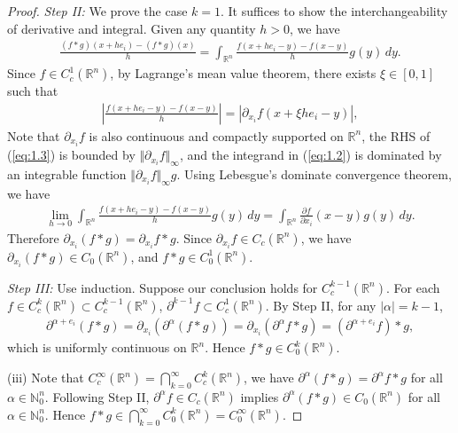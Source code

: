 \documentclass{article}
\numberwithin{equation}{section}
\newcommand{\bbR}{\mathbb{R}}
\theoremstyle{plain}
\theoremstyle{definition}
\begin{document}
\begin{proof}
	\textit{Step II:} We prove the case $k=1$. It suffices to show the interchangeability of derivative and integral. Given any quantity $h>0$, we have
	\begin{align}
		\frac{(f*g)(x+he_i) - (f*g)(x)}{h} = \int_{\bbR^n} \frac{f(x+he_i - y) - f(x-y)}{h}g(y)\,dy.\label{eq:1.2}
	\end{align}
	Since $f\in C^1_c(\mathbb{R}^n)$, by Lagrange's mean value theorem, there exists $\xi\in[0,1]$ such that
	\begin{align}
		\left\vert\frac{f(x+h e_i - y) - f(x-y)}{h}\right\vert = \left\vert \partial_{x_i}f(x+\xi h e_i - y)\right\vert,\label{eq:1.3}
	\end{align}
	Note that $\partial_{x_i}f$ is also continuous and compactly supported on $\mathbb{R}^n$, the RHS of (\ref{eq:1.3}) is bounded by $\Vert\partial_{x_i}f\Vert_\infty$, and the integrand in (\ref{eq:1.2}) is dominated by an integrable function $\Vert \partial_{x_i}f\Vert_\infty g$. Using Lebesgue's dominate convergence theorem, we have
	\begin{align*}
		\lim_{h\to 0}\int_{\bbR^n}\frac{f(x+h e_i - y) - f(x-y)}{h}g(y)\,dy = \int_{\bbR^n} \frac{\partial f}{\partial x_i}(x-y)g(y)\,dy.
	\end{align*}
	Therefore $\partial_{x_i}(f*g) = \partial_{x_i}f * g$. Since $\partial_{x_i}f\in C_c(\mathbb{R}^n)$, we have $\partial_{x_i}(f*g)\in C_0(\mathbb{R}^n)$, and $f*g\in C_0^1(\mathbb{R}^n)$.
	\vspace{0.1cm}
	
	\textit{Step III:} Use induction. Suppose our conclusion holds for $C_c^{k-1}(\mathbb{R}^n)$. For each $f\in C^k_c(\mathbb{R}^n)\subset C^{k-1}_c(\mathbb{R}^n)$, $\partial^{k-1} f\subset C^1_c(\mathbb{R}^n)$. By Step II, for any $\vert\alpha\vert=k-1$,
	\begin{align*}
		\partial^{\alpha+e_i}(f*g) = \partial_{x_i}(\partial^\alpha(f*g)) = \partial_{x_i}(\partial^\alpha f*g) = (\partial^{\alpha+e_i} f)* g,
	\end{align*} 
	which is uniformly continuous on $\mathbb{R}^n$. Hence $f*g\in C_0^k(\mathbb{R}^n)$.
	\vspace{0.1cm}
	
	(iii) Note that $C_c^\infty(\mathbb{R}^n) = \bigcap_{k=0}^\infty C_c^k(\mathbb{R}^n)$, we have $\partial^\alpha(f*g) = \partial^\alpha f * g$ for all $\alpha\in\mathbb{N}_0^n$. Following Step II, $\partial^\alpha f\in C_c(\mathbb{R}^n)$ implies $\partial^\alpha(f*g)\in C_0(\mathbb{R}^n)$ for all $\alpha\in\mathbb{N}_0^n$. Hence $f*g\in\bigcap_{k=0}^\infty C_0^k(\mathbb{R}^n) = C_0^\infty(\mathbb{R}^n)$.
\end{proof}
\end{document}
